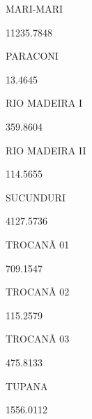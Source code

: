 \documentclass[
  letterpaper,
]{report}
\begin{document}
MARI-MARI

\n      

11235.7848

\n    

\n    

\n      

PARACONI

\n      

13.4645

\n    

\n    

\n      

RIO MADEIRA I

\n      

359.8604

\n    

\n    

\n      

RIO MADEIRA II

\n      

114.5655

\n    

\n    

\n      

SUCUNDURI

\n      

4127.5736

\n    

\n    

\n      

TROCANÃ 01

\n      

709.1547

\n    

\n    

\n      

TROCANÃ 02

\n      

115.2579

\n    

\n    

\n      

TROCANÃ 03

\n      

475.8133

\n    

\n    

\n      

TUPANA

\n      

1556.0112

\n    

\n    
\end{document}
